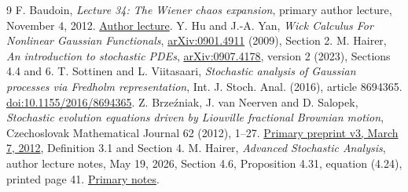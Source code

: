 \documentclass[11pt]{article}
\begin{document}
\begin{thebibliography}{9}
 F. Baudoin, \emph{Lecture 34: The Wiener chaos expansion},
primary author lecture, November 4, 2012.
\href{https://fabricebaudoin.blog/2012/11/04/lecture-34-the-wiener-chaos-expansion/}{Author lecture}.
 Y. Hu and J.-A. Yan,
\emph{Wick Calculus For Nonlinear Gaussian Functionals},
\href{https://arxiv.org/abs/0901.4911}{arXiv:0901.4911} (2009), Section 2.
 M. Hairer,
\emph{An introduction to stochastic PDEs},
\href{https://arxiv.org/abs/0907.4178}{arXiv:0907.4178},
version 2 (2023), Sections 4.4 and 6.
 T. Sottinen and L. Viitasaari,
\emph{Stochastic analysis of Gaussian processes via Fredholm representation},
Int. J. Stoch. Anal. (2016), article 8694365.
\href{https://doi.org/10.1155/2016/8694365}{doi:10.1155/2016/8694365}.
 Z. Brze\'zniak, J. van Neerven and D. Salopek,
\emph{Stochastic evolution equations driven by Liouville fractional
Brownian motion}, Czechoslovak Mathematical Journal 62 (2012), 1--27.
\href{https://arxiv.org/pdf/1001.4013}{Primary preprint v3, March 7, 2012},
Definition 3.1 and Section 4.
 M. Hairer, \emph{Advanced Stochastic Analysis},
author lecture notes, May 19, 2026, Section 4.6, Proposition 4.31,
equation (4.24), printed page 41.
\href{https://hairer.org/notes/StochasticAnalysisCourse.pdf}{Primary notes}.
\end{thebibliography}
\end{document}

